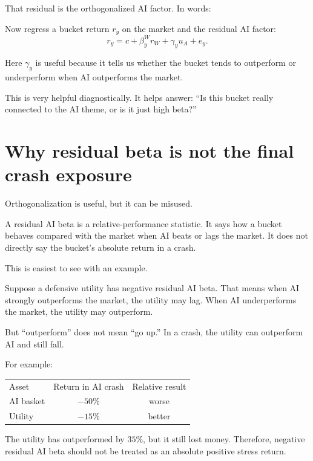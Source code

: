 \documentclass[10pt]{article}
\begin{document}
That residual is the orthogonalized AI factor. In words:

\begin{center}
\end{center}

Now regress a bucket return $r_y$ on the market and the residual AI factor:
\[
r_y=c+\beta_y^W r_W+\gamma_y u_A+e_y.
\]

Here $\gamma_y$ is useful because it tells us whether the bucket tends to outperform or underperform when AI outperforms the market.

This is very helpful diagnostically. It helps answer: ``Is this bucket really connected to the AI theme, or is it just high beta?''

\section{Why residual beta is not the final crash exposure}

Orthogonalization is useful, but it can be misused.

A residual AI beta is a relative-performance statistic. It says how a bucket behaves compared with the market when AI beats or lags the market. It does not directly say the bucket's absolute return in a crash.

This is easiest to see with an example.

Suppose a defensive utility has negative residual AI beta. That means when AI strongly outperforms the market, the utility may lag. When AI underperforms the market, the utility may outperform.

But ``outperform'' does not mean ``go up.'' In a crash, the utility can outperform AI and still fall.

For example:

\begin{center}
\begin{tabular}{lcc}
Asset & Return in AI crash & Relative result \\
AI basket & $-50\%$ & worse \\
Utility & $-15\%$ & better
\end{tabular}
\end{center}

The utility has outperformed by $35\%$, but it still lost money. Therefore, negative residual AI beta should not be treated as an absolute positive stress return.
\end{document}
